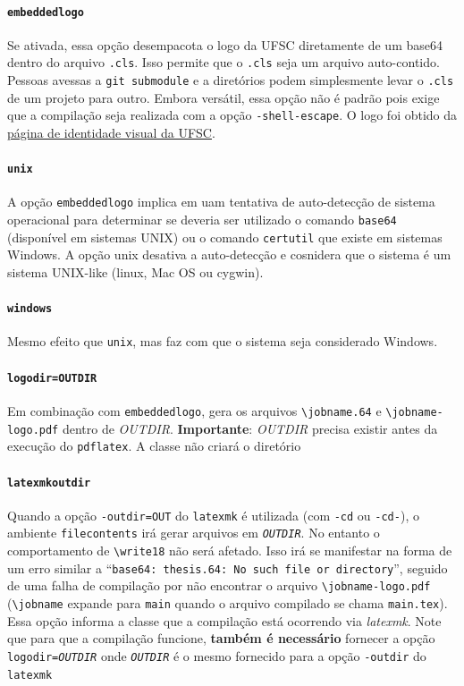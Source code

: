 \documentclass[embeddedlogo]{ufsc-thesis-rn46-2019}
\newcommand{\lacmd}[1]{\texttt{\textbackslash{}#1}}
\begin{document}
\paragraph*{\texttt{embeddedlogo}} Se ativada, essa opção desempacota o logo da
UFSC diretamente de um base64 dentro do arquivo \texttt{.cls}. Isso permite que
o \texttt{.cls} seja um arquivo auto-contido. Pessoas avessas a \texttt{git
  submodule} e a diretórios podem simplesmente levar o \texttt{.cls} de um
projeto para outro. Embora versátil, essa opção não é padrão pois exige que a
compilação seja realizada com a opção \texttt{-shell-escape}. O logo foi obtido
da \href{http://identidade.ufsc.br/}{página de identidade visual da UFSC}. 

\paragraph*{\texttt{unix}} A opção \texttt{embeddedlogo} implica em uam
tentativa de auto-detecção de sistema operacional para determinar se deveria ser
utilizado o comando \texttt{base64} (disponível em sistemas UNIX) ou o comando
\texttt{certutil} que existe em sistemas Windows. A opção unix desativa a
auto-detecção e cosnidera que o sistema é um sistema UNIX-like (linux, Mac OS ou
cygwin).

\paragraph*{\texttt{windows}} Mesmo efeito que \texttt{unix}, mas faz com que o
sistema seja considerado Windows.

{\sloppy
\paragraph*{\texttt{logodir=OUTDIR}} Em combinação com \texttt{embeddedlogo},
gera os arquivos \lacmd{jobname.64} e \lacmd{jobname-logo.pdf} dentro de
\emph{OUTDIR}. \textbf{Importante}: \emph{OUTDIR} precisa existir antes da
execução do \texttt{pdflatex}. A classe não criará o diretório
\par}

\paragraph*{\texttt{latexmkoutdir}} Quando a opção \texttt{-outdir=OUT} do
\texttt{latexmk} é utilizada (com \texttt{-cd} ou \texttt{-cd-}), o ambiente
\texttt{filecontents} irá gerar arquivos em \texttt{\emph{OUTDIR}}. No entanto o
comportamento de \lacmd{write18} não será afetado. Isso irá se manifestar na forma de
um erro similar a ``\texttt{base64: thesis.64: No such file or directory}'',
seguido de uma falha de compilação por não encontrar o arquivo
\lacmd{jobname-logo.pdf} (\lacmd{jobname} expande para \texttt{main} quando o
arquivo compilado se chama \texttt{main.tex}). Essa opção informa a classe que a
compilação está ocorrendo via \emph{latexmk}. Note que para que a compilação
funcione, \textbf{também é necessário} fornecer a opção
\texttt{logodir=\emph{OUTDIR}} onde \texttt{\emph{OUTDIR}} é o mesmo fornecido
para a opção \texttt{-outdir} do \texttt{latexmk}
\end{document}
